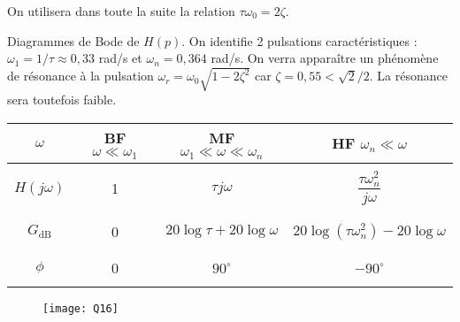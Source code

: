 \begin{multicols}{2}
On utilisera dans toute la suite la relation $\tau \omega_0= 2\zeta$.\\

\fi

%




\ifprof
\begin{corrige}
 Diagrammes de Bode de $H(p)$. On identifie 2 pulsations caractéristiques : $\omega_1=1/\tau\approx 0,33$ rad/s et $\omega_n=0,364$ rad/s. On verra apparaître un phénomène de résonance \`a la pulsation $\omega_r=\omega_0\sqrt{1-2\zeta^2}$ car $\zeta=0,55<\sqrt{2}/2$. La résonance sera toutefois faible.

\begin{table}[H]
\begin{center}
\begin{tabular}{|c|c|c|c|}
\hline
$\omega$ & BF $\omega \ll \omega_1$ & MF $\omega_1 \ll \omega \ll \omega_n$& HF $\omega_n \ll \omega$ \\
\hline
\hline
&&&\\
$H(j\omega)$ & 1 & $\tau j \omega$ & $\dfrac{\tau\omega_n^2}{j\omega}$\\
&&&\\
\hline
&&&\\
$G_{\text{dB}}$ & 0 & $20\log\tau+20\log\omega$ & $20\log(\tau \omega_n^2)-20\log\omega$\\
&&&\\
\hline
&&&\\
$\phi$ &0 & $90^\circ$ & $-90^\circ$ \\
&&&\\
\hline
\end{tabular}
\end{center}
\end{table}



\begin{figure}[H]
\centering
\texttt{[image: Q16]}
\end{figure}



\end{corrige}
\end{multicols}
